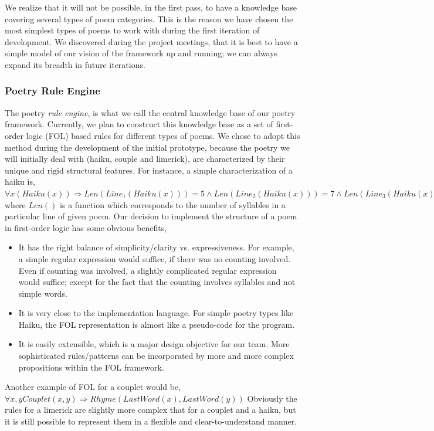 \documentclass[10pt, letter,twocolumn]{IEEEtran}
\begin{document}
We realize that it will not be possible, in the first pass, to have a knowledge base covering several types of poem categories. This is the reason we have chosen the most simplest types of poems to work with during the first iteration of development. We discovered during the project meetings, that it is best to have a simple model of our vision of the framework up and running; we can always expand its breadth in future iterations.

\subsubsection*{Poetry Rule Engine}
The poetry \textit{rule engine}, is what we call the central knowledge base of our poetry framework. Currently, we plan to construct this knowledge base as a set of first-order logic (FOL) based rules for different types of poems. We chose to adopt this method during the development of the initial prototype, because the poetry we will initially deal with (haiku, couple and limerick), are characterized by their unique and rigid structural features. For instance, a simple characterization of a haiku is,\\
 $\forall x(Haiku(x)) \Longrightarrow Len(Line_1(Haiku(x)))=5 \wedge Len(Line_2(Haiku(x)))=7 \wedge Len(Line_3(Haiku(x)))=5$\\
where $Len()$ is a function which corresponds to the number of syllables in a particular line of given poem. Our decision to implement the structure of a poem in first-order logic has some obvious benefits,
\begin{itemize}
	\item It has the right balance of simplicity/clarity  vs. expressiveness. For example, a simple regular expression would suffice, if there was no counting involved. Even if counting was involved, a slightly complicated regular expression would suffice; except for the fact that the counting involves syllables and not simple words.
	\item It is very close to the implementation language. For simple poetry types like Haiku, the FOL representation is almost like a pseudo-code for the program.
	\item It is easily extensible, which is a major design objective for our team. More sophisticated rules/patterns can be incorporated by more and more complex propositions within the FOL framework.
\end{itemize}
Another example of FOL for a couplet would be, \\
$\forall x,y Couplet(x,y) \Longrightarrow Rhyme(LastWord(x), LastWord(y))$
Obviously the rules for a limerick are slightly more complex that for a couplet and a haiku, but it is still possible to represent them in a flexible and clear-to-understand manner.
\end{document}
